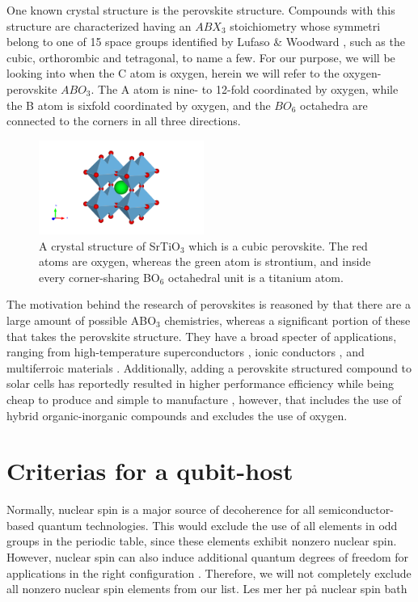 \newpage
One known crystal structure is the perovskite structure. Compounds with this structure are characterized having an $ABX_3$ stoichiometry whose symmetri belong to one of 15 space groups identified by Lufaso \& Woodward \cite{Lufaso2001}, such as the cubic, orthorombic and tetragonal, to name a few. For our purpose, we will be looking into when the C atom is oxygen, herein we will refer to the oxygen-perovskite $ABO_3$. The A atom is nine- to 12-fold coordinated by oxygen, while the B atom is sixfold coordinated by oxygen, and the $BO_6$ octahedra are connected to the corners in all three directions.

\begin{figure}
  \centering
  \includegraphics[width=0.48\textwidth]{theory/figures/SrTiO3_mp-5229_primitive.pdf}
  \caption{A crystal structure of SrTiO$_3$ which is a cubic perovskite. The red atoms are oxygen, whereas the green atom is strontium, and inside every corner-sharing BO$_6$ octahedral unit is a titanium atom.}
  \label{fig:pic}
\end{figure}

The motivation behind the research of perovskites is reasoned by that there are a large amount of possible ABO$_3$ chemistries, whereas a significant portion of these that takes the perovskite structure. They have a broad specter of applications, ranging from high-temperature superconductors \cite{Bednorz1988}, ionic conductors \cite{Boivin1998}, and  multiferroic materials \cite{Cheong2007}. Additionally, adding a perovskite structured compound to solar cells has reportedly resulted in higher performance efficiency while being cheap to produce and simple to manufacture \cite{IbnMohammed2017, Chen2014}, however, that includes the use of hybrid organic-inorganic compounds and excludes the use of oxygen.

\section{Criterias for a qubit-host}


Normally, nuclear spin is a major source of decoherence for all semiconductor-based quantum technologies. This would exclude the use of all elements in odd groups in the periodic table, since these elements exhibit nonzero nuclear spin. However, nuclear spin can also induce additional quantum degrees of freedom for applications in the right configuration \cite{Bassett2019}. Therefore, we will not completely exclude all nonzero nuclear spin elements from our list. Les mer her på nuclear spin bath



